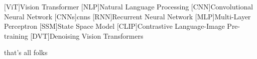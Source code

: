 \documentclass[conference]{IEEEtran}
\begin{document}
  \printbibliography

  \begin{acronym}
    [ViT]{Vision Transformer}
    [NLP]{Natural Language Processing}
    [CNN]{Convolutional Neural Network}
    [CNNs]{\acp{cnn}}
    [RNN]{Recurrent Neural Network}
    [MLP]{Multi-Layer Perceptron}
    [SSM]{State Space Model}
    [CLIP]{Contrastive Language-Image Pre-training}
    [DVT]{Denoising Vision Transformers}
  \end{acronym}


that's all folks
\end{document}
